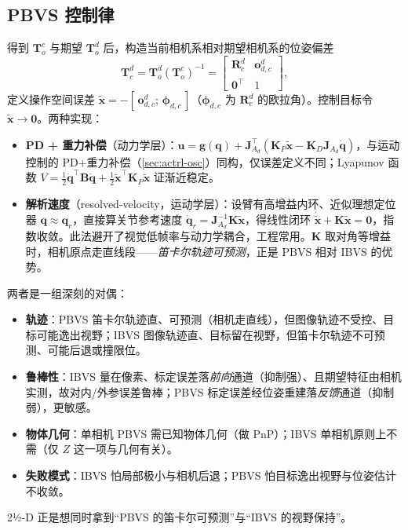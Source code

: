 \subsection{PBVS 控制律}
\label{sec:vs-pbvs-law}

得到 $\mathbf{T}_o^c$ 与期望 $\mathbf{T}_o^d$ 后，构造当前相机系相对期望相机系的位姿偏差
\begin{equation}
  \mathbf{T}_c^d=\mathbf{T}_o^d(\mathbf{T}_o^c)^{-1}=\begin{bmatrix}\mathbf{R}_c^d&\mathbf{o}_{d,c}^d\\\mathbf{0}^\top&1\end{bmatrix},
  \label{eq:vs-pose-err}
\end{equation}
定义操作空间误差 $\widetilde{\mathbf{x}}=-[\,\mathbf{o}_{d,c}^d;\,\boldsymbol{\phi}_{d,c}\,]$（$\boldsymbol{\phi}_{d,c}$ 为 $\mathbf{R}_c^d$ 的欧拉角）\cite{siciliano2009robotics}。控制目标令 $\widetilde{\mathbf{x}}\to\mathbf{0}$。两种实现：

\begin{itemize}
  \item \textbf{PD + 重力补偿}（动力学层）：$\mathbf{u}=\mathbf{g}(\mathbf{q})+\mathbf{J}_{A_d}^\top(\mathbf{K}_P\widetilde{\mathbf{x}}-\mathbf{K}_D\mathbf{J}_{A_d}\dot{\mathbf{q}})$，与运动控制的 PD+重力补偿（\cref{sec:actrl-osc}）同构，仅误差定义不同；Lyapunov 函数 $V=\tfrac12\dot{\mathbf{q}}^\top\mathbf{B}\dot{\mathbf{q}}+\tfrac12\widetilde{\mathbf{x}}^\top\mathbf{K}_P\widetilde{\mathbf{x}}$ 证渐近稳定\cite{siciliano2009robotics}。
  \item \textbf{解析速度}（resolved-velocity，运动学层）：设臂有高增益内环、近似理想定位器 $\mathbf{q}\approx\mathbf{q}_r$，直接算关节参考速度 $\dot{\mathbf{q}}_r=\mathbf{J}_{A_d}^{-1}\mathbf{K}\widetilde{\mathbf{x}}$，得线性闭环 $\dot{\widetilde{\mathbf{x}}}+\mathbf{K}\widetilde{\mathbf{x}}=\mathbf{0}$，指数收敛\cite{siciliano2009robotics}。此法避开了视觉低帧率与动力学耦合，工程常用。$\mathbf{K}$ 取对角等增益时，相机原点走直线段——\emph{笛卡尔轨迹可预测}，正是 PBVS 相对 IBVS 的优势。
\end{itemize}

\begin{insight}\label{insight:vs-ibvs-vs-pbvs}
两者是一组深刻的对偶\cite{siciliano2009robotics,chaumette2006visual}：
\begin{itemize}
  \item \textbf{轨迹}：PBVS 笛卡尔轨迹直、可预测（相机走直线），但图像轨迹不受控、目标可能逸出视野；IBVS 图像轨迹直、目标留在视野，但笛卡尔轨迹不可预测、可能后退或撞限位。
  \item \textbf{鲁棒性}：IBVS 量在像素、标定误差落\emph{前向}通道（抑制强）、且期望特征由相机实测，故对内/外参误差鲁棒；PBVS 标定误差经位姿重建落\emph{反馈}通道（抑制弱），更敏感。
  \item \textbf{物体几何}：单相机 PBVS 需已知物体几何（做 PnP）；IBVS 单相机原则上不需（仅 $Z$ 这一项与几何有关）。
  \item \textbf{失败模式}：IBVS 怕局部极小与相机后退；PBVS 怕目标逸出视野与位姿估计不收敛。
\end{itemize}
2½-D 正是想同时拿到“PBVS 的笛卡尔可预测”与“IBVS 的视野保持”。
\end{insight}

